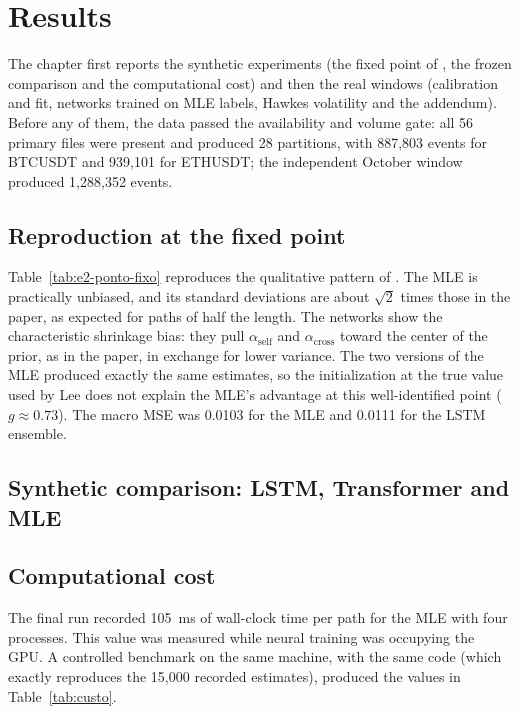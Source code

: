 \chapter{Results}
\label{cap:resultados}

The chapter first reports the synthetic experiments (the fixed point of \citet{lee2023}, the
frozen comparison and the computational cost) and then the real windows (calibration and fit,
networks trained on MLE labels, Hawkes volatility and the addendum). Before any of them, the
data passed the availability and volume gate: all 56 primary files were present and produced
28 partitions, with 887,803 events for BTCUSDT and 939,101 for ETHUSDT; the independent
October window produced 1,288,352 events.

\section{Reproduction at the fixed point}



Table~\ref{tab:e2-ponto-fixo} reproduces the qualitative pattern of \citet{lee2023}.
The MLE is practically unbiased, and its standard deviations are about \(\sqrt{2}\)
times those in the paper, as expected for paths of half the length. The networks show
the characteristic shrinkage bias: they pull \(\alpha_{\mathrm{self}}\) and
\(\alpha_{\mathrm{cross}}\) toward the center of the prior, as in the paper, in
exchange for lower variance. The two versions of the MLE produced exactly the same
estimates, so the initialization at the true value used by Lee does not explain the
MLE's advantage at this well-identified point (\(g\approx0.73\)). The macro MSE was
0.0103 for the MLE and 0.0111 for the LSTM ensemble.

\section{Synthetic comparison: LSTM, Transformer and MLE}





\section{Computational cost}
\label{sec:custo}

The final run recorded 105~ms of wall-clock time per path for the MLE with four
processes. This value was measured while neural training was occupying the GPU. A
controlled benchmark on the same machine, with the same code (which exactly
reproduces the 15,000 recorded estimates), produced the values in
Table~\ref{tab:custo}.

